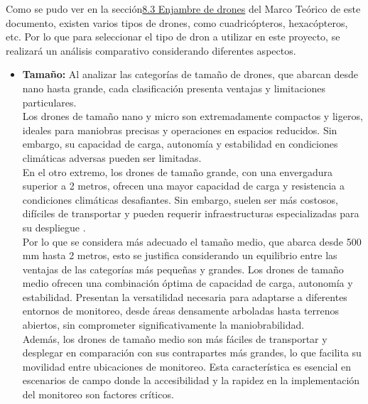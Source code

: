 Como se pudo ver en la sección\hyperref[marcodrones]{8.3 Enjambre de drones} del Marco Teórico de este documento, existen varios tipos de drones, como cuadricópteros, hexacópteros, etc. Por lo que para seleccionar el tipo de dron a utilizar en este proyecto, se realizará un análisis comparativo considerando diferentes aspectos.
\begin{itemize}
    \item \textbf{Tamaño:}
Al analizar las categorías de tamaño de drones, que abarcan desde nano hasta grande, cada clasificación presenta ventajas y limitaciones particulares. \\
Los drones de tamaño nano y micro son extremadamente compactos y ligeros, ideales para maniobras precisas y operaciones en espacios reducidos. Sin embargo, su capacidad de carga, autonomía y estabilidad en condiciones climáticas adversas pueden ser limitadas.\\
En el otro extremo, los drones de tamaño grande, con una envergadura superior a 2 metros, ofrecen una mayor capacidad de carga y resistencia a condiciones climáticas desafiantes. Sin embargo, suelen ser más costosos, difíciles de transportar y pueden requerir infraestructuras especializadas para su despliegue \cite{tipostamanios}.\\
Por lo que se considera más adecuado el tamaño medio, que abarca desde 500 mm hasta 2 metros, esto se justifica considerando un equilibrio entre las ventajas de las categorías más pequeñas y grandes. Los drones de tamaño medio ofrecen una combinación óptima de capacidad de carga, autonomía y estabilidad. Presentan la versatilidad necesaria para adaptarse a diferentes entornos de monitoreo, desde áreas densamente arboladas hasta terrenos abiertos, sin comprometer significativamente la maniobrabilidad.\\
Además, los drones de tamaño medio son más fáciles de transportar y desplegar en comparación con sus contrapartes más grandes, lo que facilita su movilidad entre ubicaciones de monitoreo. Esta característica es esencial en escenarios de campo donde la accesibilidad y la rapidez en la implementación del monitoreo son factores críticos.


\end{itemize}
